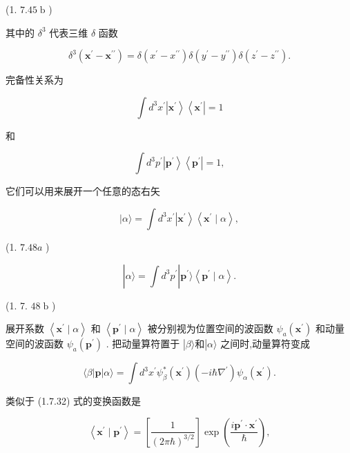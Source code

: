 \documentclass[lang=cn,newtx,10pt,scheme=chinese,thmcnt=section]{elegantbook}
\begin{document}
(1. ${7.45}\mathrm{\;b}$ )

其中的 ${\delta }^{3}$ 代表三维 $\delta$ 函数

$$
{\delta }^{3}\left( {{\mathbf{x}}^{\prime } - {\mathbf{x}}^{\prime \prime }}\right) = \delta \left( {{x}^{\prime } - {x}^{\prime \prime }}\right) \delta \left( {{y}^{\prime } - {y}^{\prime \prime }}\right) \delta \left( {{z}^{\prime } - {z}^{\prime \prime }}\right) . \tag{1. 7.46}
$$

完备性关系为

$$
\int {d}^{3}{x}^{\prime }\left| {\mathbf{x}}^{\prime }\right\rangle \left\langle {\mathbf{x}}^{\prime }\right| = 1 \tag{1.7.47a}
$$

和

$$
\int {d}^{3}{p}^{\prime }\left| {\mathbf{p}}^{\prime }\right\rangle \left\langle {\mathbf{p}}^{\prime }\right| = 1, \tag{1.7.47b}
$$

它们可以用来展开一个任意的态右矢

$$
|\alpha \rangle = \int {d}^{3}{x}^{\prime }\left| {\mathbf{x}}^{\prime }\right\rangle \left\langle {{\mathbf{x}}^{\prime } \mid \alpha }\right\rangle ,
$$

(1. ${7.48a}$ )

$$
\left| {\alpha \rangle = \int {d}^{3}{p}^{\prime }}\right| {\mathbf{p}}^{\prime }\rangle \left\langle {{\mathbf{p}}^{\prime } \mid \alpha }\right\rangle .
$$

(1. 7. ${48}\mathrm{\;b}$ )

展开系数 $\left\langle {{\mathbf{x}}^{\prime } \mid \alpha }\right\rangle$ 和 $\left\langle {{\mathbf{p}}^{\prime } \mid \alpha }\right\rangle$ 被分别视为位置空间的波函数 ${\psi }_{a}\left( {\mathbf{x}}^{\prime }\right)$ 和动量空间的波函数 ${\psi }_{a}\left( {\mathbf{p}}^{\prime }\right)$ . 把动量算符置于 $\left| {\beta \rangle \text{和}}\right| \alpha \rangle$ 之间时,动量算符变成

$$
\langle \beta \left| \mathbf{p}\right| \alpha \rangle = \int {d}^{3}{x}^{\prime }{\psi }_{\beta }^{ * }\left( {\mathbf{x}}^{\prime }\right) \left( {-i\hbar {\nabla }^{\prime }}\right) {\psi }_{\alpha }\left( {\mathbf{x}}^{\prime }\right) . \tag{1. 7.49}
$$

类似于 (1.7.32) 式的变换函数是

$$
\left\langle {{\mathbf{x}}^{\prime } \mid {\mathbf{p}}^{\prime }}\right\rangle = \left\lbrack \frac{1}{{\left( 2\pi \hbar \right) }^{3/2}}\right\rbrack \exp \left( \frac{i{\mathbf{p}}^{\prime } \cdot {\mathbf{x}}^{\prime }}{\hbar }\right) , \tag{1. 7.50}
$$
\end{document}
